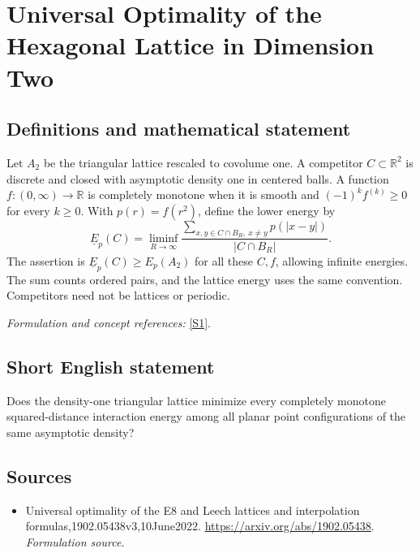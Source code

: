 \documentclass[11pt]{article}
\begin{document}
\section*{\texorpdfstring{Universal Optimality of the Hexagonal Lattice in Dimension Two}{Universal Optimality of the Hexagonal Lattice in Dimension Two}}\label{statement}
\subsection{Definitions and mathematical statement}
Let $A_2$ be the triangular lattice rescaled to covolume one. A competitor $C\subset{\mathbb{R}}^2$ is discrete and closed with asymptotic density one in centered balls. A function $f:(0,\infty)\to{\mathbb{R}}$ is completely monotone when it is smooth and $(-1)^kf^{(k)}\ge0$ for every $k\ge0$. With $p(r)=f(r^2)$, define the lower energy by
\[
 \underline E_p(C)=\liminf_{R\to\infty}
 \frac{\sum_{x,y\in C\cap B_R,\ x\ne y}p(|x-y|)}{|C\cap B_R|}.
\]
The assertion is $\underline E_p(C)\ge E_p(A_2)$ for all these $C,f$, allowing infinite energies. The sum counts ordered pairs, and the lattice energy uses the same convention. Competitors need not be lattices or periodic.
\par\smallskip\textit{Formulation and concept references:} \href{https://arxiv.org/abs/1902.05438}{[S1]}.

\subsection{Short English statement}
Does the density-one triangular lattice minimize every completely monotone squared-distance interaction energy among all planar point configurations of the same asymptotic density?
\subsection{Sources}
\begin{itemize}
\item[S1]Universal optimality of the E8 and Leech lattices and interpolation formulas,1902.05438v3,10June2022.
\url{https://arxiv.org/abs/1902.05438}.
\textit{Formulation source.}
\end{itemize}
\end{document}
